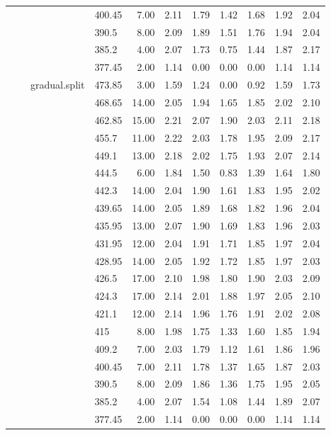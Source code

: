 \begin{longtable}{llllrrrrrrr}
   &  &  & 400.45 & 7.00 & 2.11 & 1.79 & 1.42 & 1.68 & 1.92 & 2.04 \\ 
   &  &  & 390.5 & 8.00 & 2.09 & 1.89 & 1.51 & 1.76 & 1.94 & 2.04 \\ 
   &  &  & 385.2 & 4.00 & 2.07 & 1.73 & 0.75 & 1.44 & 1.87 & 2.17 \\ 
   &  &  & 377.45 & 2.00 & 1.14 & 0.00 & 0.00 & 0.00 & 1.14 & 1.14 \\ 
   &  & gradual.split & 473.85 & 3.00 & 1.59 & 1.24 & 0.00 & 0.92 & 1.59 & 1.73 \\ 
   &  &  & 468.65 & 14.00 & 2.05 & 1.94 & 1.65 & 1.85 & 2.02 & 2.10 \\ 
   &  &  & 462.85 & 15.00 & 2.21 & 2.07 & 1.90 & 2.03 & 2.11 & 2.18 \\ 
   &  &  & 455.7 & 11.00 & 2.22 & 2.03 & 1.78 & 1.95 & 2.09 & 2.17 \\ 
   &  &  & 449.1 & 13.00 & 2.18 & 2.02 & 1.75 & 1.93 & 2.07 & 2.14 \\ 
   &  &  & 444.5 & 6.00 & 1.84 & 1.50 & 0.83 & 1.39 & 1.64 & 1.80 \\ 
   &  &  & 442.3 & 14.00 & 2.04 & 1.90 & 1.61 & 1.83 & 1.95 & 2.02 \\ 
   &  &  & 439.65 & 14.00 & 2.05 & 1.89 & 1.68 & 1.82 & 1.96 & 2.04 \\ 
   &  &  & 435.95 & 13.00 & 2.07 & 1.90 & 1.69 & 1.83 & 1.96 & 2.03 \\ 
   &  &  & 431.95 & 12.00 & 2.04 & 1.91 & 1.71 & 1.85 & 1.97 & 2.04 \\ 
   &  &  & 428.95 & 14.00 & 2.05 & 1.92 & 1.72 & 1.85 & 1.97 & 2.03 \\ 
   &  &  & 426.5 & 17.00 & 2.10 & 1.98 & 1.80 & 1.90 & 2.03 & 2.09 \\ 
   &  &  & 424.3 & 17.00 & 2.14 & 2.01 & 1.88 & 1.97 & 2.05 & 2.10 \\ 
   &  &  & 421.1 & 12.00 & 2.14 & 1.96 & 1.76 & 1.91 & 2.02 & 2.08 \\ 
   &  &  & 415 & 8.00 & 1.98 & 1.75 & 1.33 & 1.60 & 1.85 & 1.94 \\ 
   &  &  & 409.2 & 7.00 & 2.03 & 1.79 & 1.12 & 1.61 & 1.86 & 1.96 \\ 
   &  &  & 400.45 & 7.00 & 2.11 & 1.78 & 1.37 & 1.65 & 1.87 & 2.03 \\ 
   &  &  & 390.5 & 8.00 & 2.09 & 1.86 & 1.36 & 1.75 & 1.95 & 2.05 \\ 
   &  &  & 385.2 & 4.00 & 2.07 & 1.54 & 1.08 & 1.44 & 1.89 & 2.07 \\ 
   &  &  & 377.45 & 2.00 & 1.14 & 0.00 & 0.00 & 0.00 & 1.14 & 1.14 \\ 

\end{longtable}
